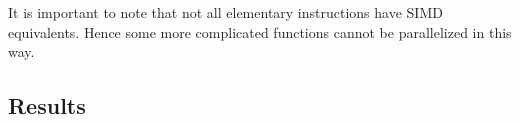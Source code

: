 It is important to note that not all elementary instructions have SIMD equivalents. Hence 
some more complicated functions cannot be parallelized in this way. 


\subsection{Results}



